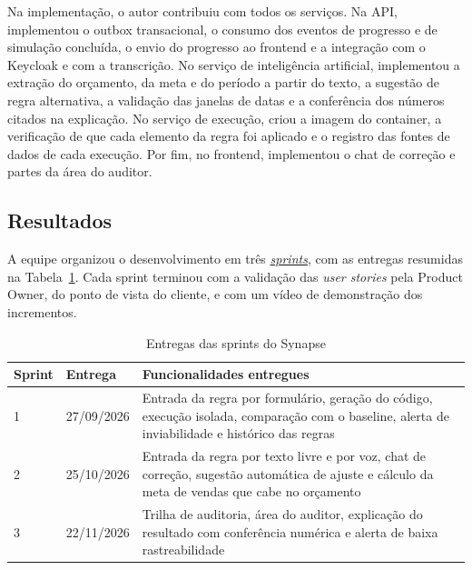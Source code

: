 \documentclass[12pt,a4paper]{article}
\newcommand{\termo}[2]{\hyperlink{gls:#1}{\textit{#2}}}
\newcommand{\fonte}[1]{\par\vspace{2pt}{\noindent\hspace{0.6cm}Fonte: #1\par}}
\newcommand{\ano}{2026}
\begin{document}
Na implementação, o autor contribuiu com todos os serviços. Na API, implementou o outbox transacional, o consumo dos eventos de progresso e de simulação concluída, o envio do progresso ao frontend e a integração com o Keycloak e com a transcrição. No serviço de inteligência artificial, implementou a extração do orçamento, da meta e do período a partir do texto, a sugestão de regra alternativa, a validação das janelas de datas e a conferência dos números citados na explicação. No serviço de execução, criou a imagem do container, a verificação de que cada elemento da regra foi aplicado e o registro das fontes de dados de cada execução. Por fim, no frontend, implementou o chat de correção e partes da área do auditor.

\subsection{Resultados}

A equipe organizou o desenvolvimento em três \termo{sprint}{sprints}, com as entregas resumidas na Tabela~\ref{tab:sprints}. Cada sprint terminou com a validação das \textit{user stories} pela Product Owner, do ponto de vista do cliente, e com um vídeo de demonstração dos incrementos.

\begin{table}[H]
\centering
\caption{Entregas das sprints do Synapse}
\label{tab:sprints}
\renewcommand{\arraystretch}{1.1}
\begin{tabular}{p{1.3cm} p{2.2cm} p{11.2cm}}
\toprule
\textbf{Sprint} & \textbf{Entrega} & \textbf{Funcionalidades entregues} \\
\midrule
1 & 27/09/2026 & Entrada da regra por formulário, geração do código, execução isolada, comparação com o baseline, alerta de inviabilidade e histórico das regras \\
2 & 25/10/2026 & Entrada da regra por texto livre e por voz, chat de correção, sugestão automática de ajuste e cálculo da meta de vendas que cabe no orçamento \\
3 & 22/11/2026 & Trilha de auditoria, área do auditor, explicação do resultado com conferência numérica e alerta de baixa rastreabilidade \\
\bottomrule
\end{tabular}
\fonte{Elaborado por GARCIA, (\ano).}
\end{table}
\end{document}
